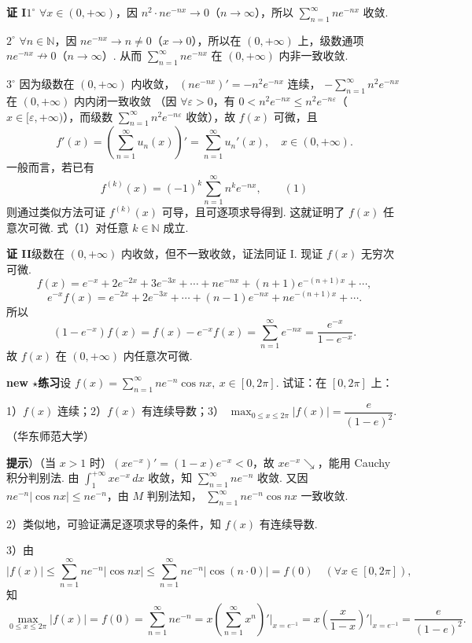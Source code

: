 \documentclass[UTF8,12pt,a4paper,fontset=fandol]{ctexart}
\begin{document}
\noindent\textbf{证 I}\quad $1^\circ$ $\forall x\in(0,+\infty)$，因
$n^2\cdot ne^{-nx}\to0$（$n\to\infty$），所以
$\displaystyle\sum_{n=1}^{\infty}ne^{-nx}$ 收敛.

$2^\circ$ $\forall n\in\mathbb N$，因 $ne^{-nx}\to n\ne0$（$x\to0$），所以在
$(0,+\infty)$ 上，级数通项 $ne^{-nx}\nrightarrow0$（$n\to\infty$）. 从而
$\displaystyle\sum_{n=1}^{\infty}ne^{-nx}$ 在 $(0,+\infty)$ 内非一致收敛.

$3^\circ$ 因为级数在 $(0,+\infty)$ 内收敛，
$(ne^{-nx})'=-n^2e^{-nx}$ 连续，
$-\displaystyle\sum_{n=1}^{\infty}n^2e^{-nx}$ 在 $(0,+\infty)$ 内内闭一致收敛
（因 $\forall\varepsilon>0$，有
$0<n^2e^{-nx}\le n^2e^{-n\varepsilon}$（$x\in[\varepsilon,+\infty)$），而级数
$\displaystyle\sum_{n=1}^{\infty}n^2e^{-n\varepsilon}$ 收敛），故 $f(x)$ 可微，且
\[
  f'(x)=\left(\sum_{n=1}^{\infty}u_n(x)\right)'
  =\sum_{n=1}^{\infty}u_n'(x),\quad x\in(0,+\infty).
\]
一般而言，若已有
\[
  f^{(k)}(x)=(-1)^k\sum_{n=1}^{\infty}n^ke^{-nx},
\qquad(1)
\]
则通过类似方法可证 $f^{(k)}(x)$ 可导，且可逐项求导得到. 这就证明了 $f(x)$ 任意次可微.
式（1）对任意 $k\in\mathbb N$ 成立.

\noindent\textbf{证 II}\quad 级数在 $(0,+\infty)$ 内收敛，但不一致收敛，证法同证 I. 现证
$f(x)$ 无穷次可微.
\[
  f(x)=e^{-x}+2e^{-2x}+3e^{-3x}+\cdots+ne^{-nx}+(n+1)e^{-(n+1)x}+\cdots,
\]
\[
  e^{-x}f(x)=e^{-2x}+2e^{-3x}+\cdots+(n-1)e^{-nx}+ne^{-(n+1)x}+\cdots.
\]
所以
\[
  (1-e^{-x})f(x)=f(x)-e^{-x}f(x)
  =\sum_{n=1}^{\infty}e^{-nx}=\frac{e^{-x}}{1-e^{-x}}.
\]
故 $f(x)$ 在 $(0,+\infty)$ 内任意次可微.

\noindent\textbf{new $\star$练习}\quad 设
$f(x)=\displaystyle\sum_{n=1}^{\infty}ne^{-n}\cos nx,\ x\in[0,2\pi]$. 试证：在
$[0,2\pi]$ 上：

1）$f(x)$ 连续；2）$f(x)$ 有连续导数；3）
$\displaystyle\max_{0\le x\le2\pi}|f(x)|=\dfrac{e}{(1-e)^2}$.（华东师范大学）

\noindent\textbf{提示}）（当 $x>1$ 时）$(xe^{-x})'=(1-x)e^{-x}<0$，故
$xe^{-x}\searrow$，能用 Cauchy 积分判别法. 由 $\displaystyle\int_1^{+\infty}xe^{-x}\,dx$
收敛，知 $\displaystyle\sum_{n=1}^{\infty}ne^{-n}$ 收敛. 又因
$ne^{-n}|\cos nx|\le ne^{-n}$，由 $M$ 判别法知，
$\displaystyle\sum_{n=1}^{\infty}ne^{-n}\cos nx$ 一致收敛.

2）类似地，可验证满足逐项求导的条件，知 $f(x)$ 有连续导数.

3）由
\[
  |f(x)|\le \sum_{n=1}^{\infty}ne^{-n}|\cos nx|
  \le \sum_{n=1}^{\infty}ne^{-n}|\cos(n\cdot0)|=f(0)\quad(\forall x\in[0,2\pi]),
\]
知
\[
  \max_{0\le x\le2\pi}|f(x)|=f(0)
  =\sum_{n=1}^{\infty}ne^{-n}
  =x\left(\sum_{n=1}^{\infty}x^n\right)'\bigg|_{x=e^{-1}}
  =x\left(\frac{x}{1-x}\right)'\bigg|_{x=e^{-1}}
  =\frac{e}{(1-e)^2}.
\]
\end{document}
